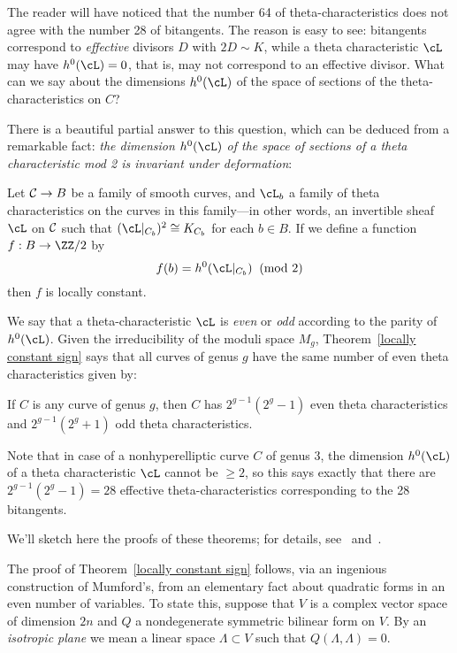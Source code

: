 The reader will have noticed that the number 64 of theta-characteristics does not agree with the number 28 of bitangents. The reason is easy to see: bitangents correspond to \emph{effective} divisors $D$ with $2D \sim K$, while a theta characteristic $\cL$ may have $h^0(\cL) = 0$, that is, may not correspond to an effective divisor. What can we say about the dimensions $h^0(\cL)$ of the space of sections of the theta-characteristics on $C$?
 
 There is a beautiful partial answer to this question, which can be deduced from a remarkable fact: \emph{the dimension $h^0(\cL)$ of the space of sections of a theta characteristic mod 2 is invariant under deformation}:
  
 \begin{theorem}\label{locally constant sign} Let $\cC \to B$ be a family of smooth curves, and $\cL_b$ a family of theta characteristics on the curves in this family---in other words, an invertible sheaf $\cL$ on $\cC$ such that $(\cL|_{C_b})^2 \cong K_{C_b}$ for each $b \in B$. If we define a function $f : B \to \ZZ/2$  by
 $$
 f(b) = h^0(\cL|_{C_b}) \;  \; (\text{mod } 2)
 $$
then $f$ is locally constant.
\end{theorem}

We say that a theta-characteristic $\cL$ is \emph{even} or \emph{odd} according to the parity of $h^0(\cL)$. Given the irreducibility of the moduli space $M_g$,  Theorem~\ref{locally constant sign} says that all curves of genus $g$ have the same number of even theta characteristics given by: 

\begin{theorem}\label{number of theta characteristics}
If $C$ is any curve of genus $g$, then $C$ has $2^{g-1}(2^g - 1)$ even theta characteristics and $2^{g-1}(2^g+1)$ odd theta characteristics.
\end{theorem}

Note that in case of a nonhyperelliptic curve $C$ of genus 3, the dimension $h^0(\cL)$ of a theta characteristic $\cL$ cannot be $\geq 2$, so this says exactly that there are $2^{g-1}(2^g-1) = 28$ effective theta-characteristics corresponding to the 28 bitangents.

We'll sketch here the proofs of these theorems; for details, see~\cite{MumfordPaper} and~\cite{JHPaper}. 

The proof of Theorem~\ref{locally constant sign} follows, via an ingenious construction of Mumford's, from an elementary fact about quadratic forms in an even number of variables. To state this, suppose that $V$ is a complex vector space of dimension $2n$ and $Q$ a nondegenerate symmetric bilinear form on $V$. By an \emph{isotropic plane} we mean a linear space $\Lambda \subset V$ such that $Q(\Lambda, \Lambda) = 0$. 

